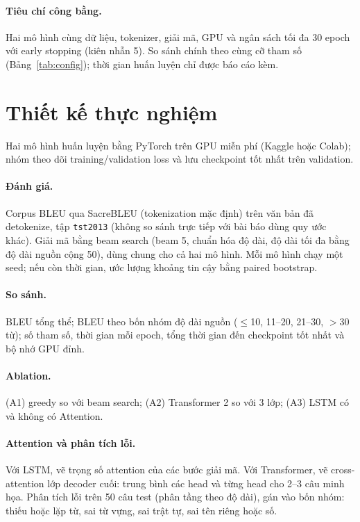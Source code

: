 \documentclass[11pt,a4paper]{article}
\begin{document}
\paragraph{Tiêu chí công bằng.} Hai mô hình cùng dữ liệu,
tokenizer, giải mã, GPU và ngân sách tối đa 30 epoch với
early stopping (kiên nhẫn 5). So sánh chính theo cùng cỡ
tham số (Bảng~\ref{tab:config}); thời gian huấn luyện chỉ
được báo cáo kèm.

\section{Thiết kế thực nghiệm}
\label{sec:exp}

Hai mô hình huấn luyện bằng PyTorch trên GPU miễn phí
(Kaggle hoặc Colab); nhóm theo dõi training/validation
loss và lưu checkpoint tốt nhất trên validation.

\paragraph{Đánh giá.} Corpus BLEU \citep{papineni2002bleu}
qua SacreBLEU (tokenization mặc định) trên văn bản đã
detokenize, tập \texttt{tst2013} (không so sánh trực tiếp
với bài báo dùng quy ước khác). Giải mã bằng beam search
(beam 5, chuẩn hóa độ dài, độ dài tối đa bằng độ dài
nguồn cộng 50), dùng chung cho cả hai mô hình. Mỗi mô
hình chạy một seed; nếu còn thời gian, ước lượng khoảng
tin cậy bằng paired bootstrap.

\paragraph{So sánh.} BLEU tổng thể; BLEU theo bốn nhóm độ
dài nguồn ($\le$10, 11--20, 21--30, $>$30 từ); số tham số,
thời gian mỗi epoch, tổng thời gian đến checkpoint tốt
nhất và bộ nhớ GPU đỉnh.

\paragraph{Ablation.} (A1) greedy so với beam search;
(A2) Transformer 2 so với 3 lớp; (A3) LSTM có và không
có Attention.

\paragraph{Attention và phân tích lỗi.} Với LSTM, vẽ trọng
số attention của các bước giải mã. Với Transformer, vẽ
cross-attention lớp decoder cuối: trung bình các head và
từng head cho 2--3 câu minh họa. Phân tích lỗi trên 50 câu
test (phân tầng theo độ dài), gán vào bốn nhóm: thiếu hoặc
lặp từ, sai từ vựng, sai trật tự, sai tên riêng hoặc số.
\end{document}
